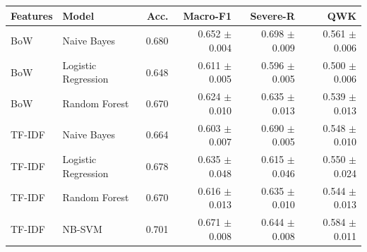 \begin{tabular}{llrrrr}
\toprule
Features & Model & Acc. & Macro-F1 & Severe-R & QWK \\
\midrule
BoW & Naive Bayes & 0.680 & 0.652 $\pm$ 0.004 & 0.698 $\pm$ 0.009 & 0.561 $\pm$ 0.006 \\
BoW & Logistic Regression & 0.648 & 0.611 $\pm$ 0.005 & 0.596 $\pm$ 0.005 & 0.500 $\pm$ 0.006 \\
BoW & Random Forest & 0.670 & 0.624 $\pm$ 0.010 & 0.635 $\pm$ 0.013 & 0.539 $\pm$ 0.013 \\
TF-IDF & Naive Bayes & 0.664 & 0.603 $\pm$ 0.007 & 0.690 $\pm$ 0.005 & 0.548 $\pm$ 0.010 \\
TF-IDF & Logistic Regression & 0.678 & 0.635 $\pm$ 0.048 & 0.615 $\pm$ 0.046 & 0.550 $\pm$ 0.024 \\
TF-IDF & Random Forest & 0.670 & 0.616 $\pm$ 0.013 & 0.635 $\pm$ 0.010 & 0.544 $\pm$ 0.013 \\
TF-IDF & NB-SVM & 0.701 & 0.671 $\pm$ 0.008 & 0.644 $\pm$ 0.008 & 0.584 $\pm$ 0.011 \\
\bottomrule
\end{tabular}%
